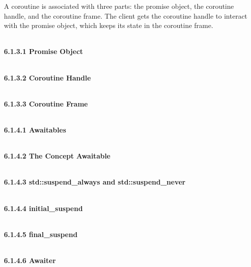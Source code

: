 A coroutine is associated with three parts: the promise object, the coroutine handle, and the coroutine frame. The client gets the coroutine handle to interact with the promise object, which keeps its state in the coroutine frame.

\hspace*{\fill} \\ %
\noindent
\textbf{6.1.3.1\hspace{0.2cm} Promise Object}


\hspace*{\fill} \\ %
\noindent
\textbf{6.1.3.2\hspace{0.2cm} Coroutine Handle}


\hspace*{\fill} \\ %
\noindent
\textbf{6.1.3.3\hspace{0.2cm} Coroutine Frame}



\hspace*{\fill} \\ %
\noindent
\textbf{6.1.4.1\hspace{0.2cm} Awaitables}


\hspace*{\fill} \\ %
\noindent
\textbf{6.1.4.2\hspace{0.2cm} The Concept Awaitable}


\hspace*{\fill} \\ %
\noindent
\textbf{6.1.4.3\hspace{0.2cm} std::suspend\_always and std::suspend\_never}


\hspace*{\fill} \\ %
\noindent
\textbf{6.1.4.4\hspace{0.2cm} initial\_suspend}


\hspace*{\fill} \\ %
\noindent
\textbf{6.1.4.5\hspace{0.2cm} final\_suspend}


\hspace*{\fill} \\ %
\noindent
\textbf{6.1.4.6\hspace{0.2cm} Awaiter}


